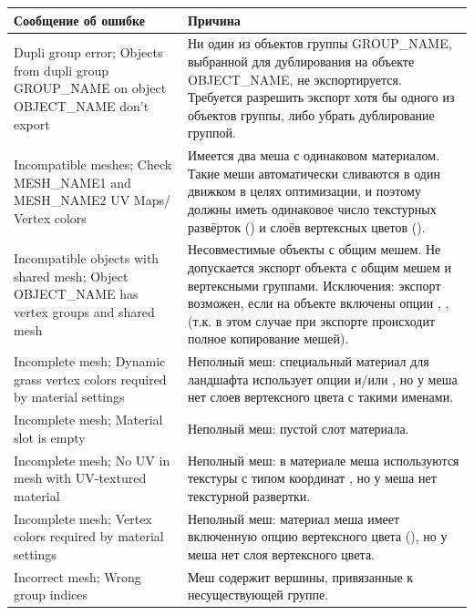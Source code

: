 \documentclass[a4paper,12pt,oneside]{sphinxmanual}
\begin{document}
\begin{tabulary}{\linewidth}{|L|L|}
\hline
\textsf{\relax 
Сообщение об ошибке
} & \textsf{\relax 
Причина
}\\
\hline
Dupli group error; Objects from
dupli group GROUP\_NAME on object
OBJECT\_NAME don't export
 & 
Ни один из объектов группы GROUP\_NAME,
выбранной для дублирования на объекте
OBJECT\_NAME, не экспортируется. Требуется
разрешить экспорт хотя бы одного из
объектов группы, либо убрать дублирование
группой.
\\

Incompatible meshes; Check
MESH\_NAME1 and MESH\_NAME2 UV Maps/
Vertex colors
 & 
Имеется два меша с одинаковом материалом.
Такие меши автоматически сливаются в один
движком в целях оптимизации, и поэтому
должны иметь одинаковое число текстурных
развёрток () и слоёв
вертексных цветов ().
\\

Incompatible objects with
shared mesh; Object OBJECT\_NAME
has vertex groups and shared mesh
 & 
Несовместимые объекты с общим мешем.
Не допускается экспорт объекта с общим
мешем и вертексными группами. Исключения:
экспорт возможен, если
на объекте включены опции
,
,
(т.к. в этом случае при экспорте
происходит полное копирование мешей).
\\

Incomplete mesh; Dynamic grass
vertex colors required
by material settings
 & 
Неполный меш: специальный материал для
ландшафта использует опции
 и/или
, но у меша нет
слоев вертексного цвета с такими именами.
\\

Incomplete mesh; Material slot is
empty
 & 
Неполный меш: пустой слот материала.
\\

Incomplete mesh; No UV in mesh
with UV-textured material
 & 
Неполный меш: в материале меша
используются текстуры с типом координат
, но у меша нет текстурной
развертки.
\\

Incomplete mesh; Vertex colors
required by material settings
 & 
Неполный меш: материал меша имеет
включенную опцию вертексного цвета
(), но у меша нет
слоя вертексного цвета.
\\

Incorrect mesh; Wrong group indices
 & 
Меш содержит вершины, привязанные к
несуществующей группе.
\\


\end{tabulary}
\end{document}
